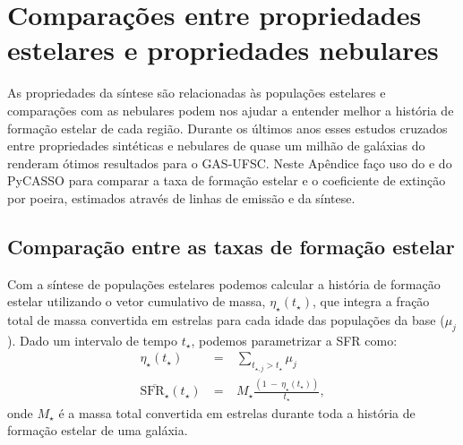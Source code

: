

\chapter{Comparações entre propriedades estelares e propriedades nebulares}
\label{apendice:synvsneb}

As propriedades da síntese são relacionadas às populações estelares e comparações com as nebulares podem nos ajudar a entender melhor a história de formação estelar de cada região. Durante os últimos anos esses estudos cruzados entre propriedades sintéticas e nebulares de quase um milhão de galáxias do \SDSS renderam ótimos resultados para o GAS-UFSC. Neste Apêndice faço uso do \emldc e do PyCASSO para comparar a taxa de formação estelar e o coeficiente de extinção por poeira, estimados através de linhas de emissão e da síntese.


\section{Comparação entre as taxas de formação estelar}
\label{apendice:synvsneb:SFR}

Com a síntese de populações estelares podemos calcular a história de formação estelar utilizando o vetor cumulativo de massa, $\eta_\star(t_\star)$, que integra a fração total de massa convertida em estrelas para cada idade das populações da base ($\mu_j$). Dado um intervalo de tempo $t_\star$, podemos parametrizar a SFR como:
\begin{eqnarray}
	\eta_\star(t_\star)\ &=&\ \sum\limits_{t_{\star,j} > t_\star} \mu_j \\
	\overline{\mathrm{SFR}_\star}(t_\star)\ &=&\ M_\star \frac{(1\ -\ \eta_\star(t_\star))}{t_\star},
	\label{eq:SFRSyn}
\end{eqnarray}
\noindent onde $M_\star$ é a massa total convertida em estrelas durante toda a história de formação estelar de uma galáxia.


